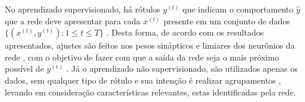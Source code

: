 No aprendizado supervisionado, há rótulos $y^{(t)}$ que indicam o comportamento $\widehat{y}$ que a rede deve apresentar para cada $x^{(t)}$ presente em um conjunto de dados $\{(x^{(t)}, y^{(t)}): 1 \leqslant t \leqslant T\}$ \cite{bezerra2016}. Desta forma, de acordo com os resultados apresentados, ajustes são feitos nos pesos sinápticos e limiares dos neurônios da rede \cite{livroNunes2016}, com o objetivo de fazer com que a saída da rede seja o mais próximo possível de $y^{(t)}$ \cite{Osorio1999}. Já o aprendizado não supervisionado, são utilizados apenas os dados, sem qualquer tipo de rótulo e sua intenção é realizar agrupamentos \cite{Camila2017}, levando em consideração características relevantes, estas identificadas pela rede.





